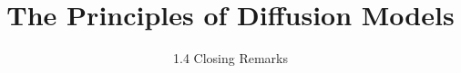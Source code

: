 ﻿%

\title{The Principles of Diffusion Models}
\subtitle{1.4 Closing Remarks}


\begin{frame}
    \titlepage
\end{frame}


